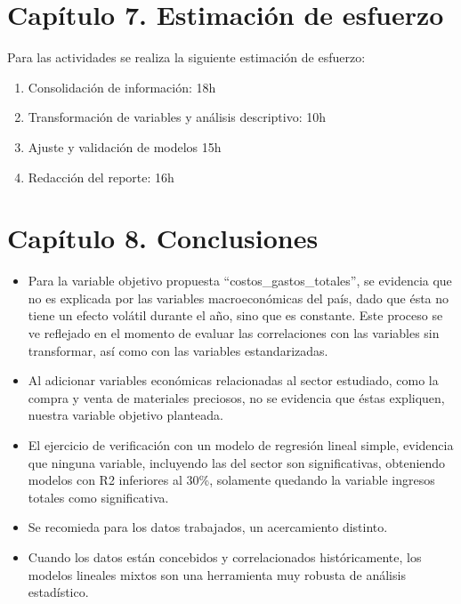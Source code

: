 \documentclass[
  11pt,
  a4paper,
]{book}
\providecommand{\tightlist}{%
  \setlength{\itemsep}{0pt}\setlength{\parskip}{0pt}}
\begin{document}
\hypertarget{capuxedtulo-7.-estimaciuxf3n-de-esfuerzo}{%
\chapter{Capítulo 7. Estimación de
esfuerzo}\label{capuxedtulo-7.-estimaciuxf3n-de-esfuerzo}}

Para las actividades se realiza la siguiente estimación de esfuerzo:

\begin{enumerate}
\def\labelenumi{\arabic{enumi})}
\tightlist
\item
  Consolidación de información: 18h
\item
  Transformación de variables y análisis descriptivo: 10h
\item
  Ajuste y validación de modelos 15h
\item
  Redacción del reporte: 16h
\end{enumerate}

\hypertarget{capuxedtulo-8.-conclusiones}{%
\chapter{Capítulo 8. Conclusiones}\label{capuxedtulo-8.-conclusiones}}

\begin{itemize}
\tightlist
\item
  Para la variable objetivo propuesta ``costos\_gastos\_totales'', se
  evidencia que no es explicada por las variables macroeconómicas del
  país, dado que ésta no tiene un efecto volátil durante el año, sino
  que es constante. Este proceso se ve reflejado en el momento de
  evaluar las correlaciones con las variables sin transformar, así como
  con las variables estandarizadas.
\item
  Al adicionar variables económicas relacionadas al sector estudiado,
  como la compra y venta de materiales preciosos, no se evidencia que
  éstas expliquen, nuestra variable objetivo planteada.
\item
  El ejercicio de verificación con un modelo de regresión lineal simple,
  evidencia que ninguna variable, incluyendo las del sector son
  significativas, obteniendo modelos con R2 inferiores al 30\%,
  solamente quedando la variable ingresos totales como significativa.
\item
  Se recomieda para los datos trabajados, un acercamiento distinto.
\item
  Cuando los datos están concebidos y correlacionados históricamente,
  los modelos lineales mixtos son una herramienta muy robusta de
  análisis estadístico.
\end{itemize}
\end{document}
